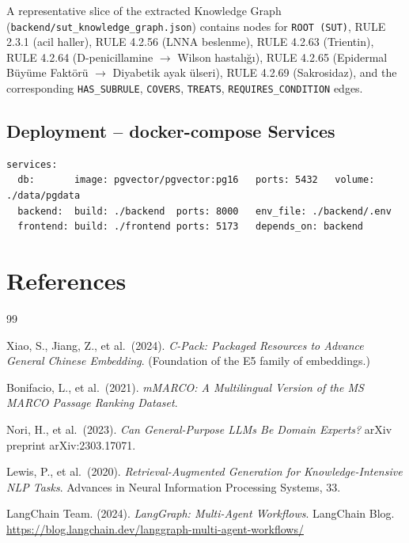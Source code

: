 \documentclass[11pt, a4paper]{article}
\begin{document}
\begin{itemize}[leftmargin=*]
A representative slice of the extracted Knowledge Graph (\texttt{backend/sut\_knowledge\_graph.json}) contains nodes for \texttt{ROOT (SUT)}, RULE 2.3.1 (acil haller), RULE 4.2.56 (LNNA beslenme), RULE 4.2.63 (Trientin), RULE 4.2.64 (D-penicillamine $\to$ Wilson hastalığı), RULE 4.2.65 (Epidermal Büyüme Faktörü $\to$ Diyabetik ayak ülseri), RULE 4.2.69 (Sakrosidaz), and the corresponding \texttt{HAS\_SUBRULE}, \texttt{COVERS}, \texttt{TREATS}, \texttt{REQUIRES\_CONDITION} edges.

\subsection{Deployment -- docker-compose Services}

\begin{lstlisting}[basicstyle=\ttfamily\scriptsize]
services:
  db:       image: pgvector/pgvector:pg16   ports: 5432   volume: ./data/pgdata
  backend:  build: ./backend  ports: 8000   env_file: ./backend/.env
  frontend: build: ./frontend ports: 5173   depends_on: backend
\end{lstlisting}

\section{References}

\begin{thebibliography}{99}

Xiao, S., Jiang, Z., et al.\ (2024). \textit{C-Pack: Packaged Resources to Advance General Chinese Embedding}. (Foundation of the E5 family of embeddings.)

Bonifacio, L., et al.\ (2021). \textit{mMARCO: A Multilingual Version of the MS MARCO Passage Ranking Dataset}.

Nori, H., et al.\ (2023). \textit{Can General-Purpose LLMs Be Domain Experts?} arXiv preprint arXiv:2303.17071.

Lewis, P., et al.\ (2020). \textit{Retrieval-Augmented Generation for Knowledge-Intensive NLP Tasks}. Advances in Neural Information Processing Systems, 33.

LangChain Team. (2024). \textit{LangGraph: Multi-Agent Workflows}. LangChain Blog. \url{https://blog.langchain.dev/langgraph-multi-agent-workflows/}


\end{thebibliography}
\end{itemize}
\end{document}
